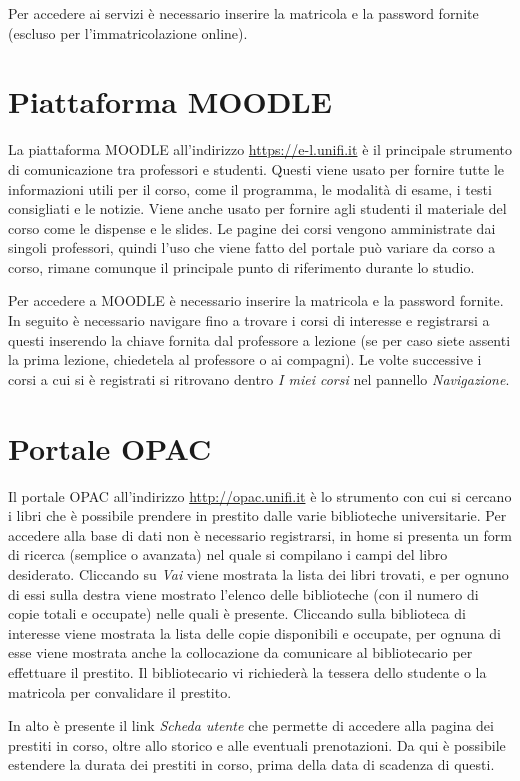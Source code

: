\documentclass[11pt,a4paper]{article}
\begin{document}
Per accedere ai servizi è necessario inserire la matricola e
la password fornite (escluso per l'immatricolazione online).

\section{Piattaforma MOODLE}
La piattaforma MOODLE all'indirizzo \url{https://e-l.unifi.it} è il
principale strumento di comunicazione tra professori e
studenti. Questi viene usato per fornire tutte le informazioni
utili per il corso, come il programma, le modalità di esame, i testi
consigliati e le notizie. Viene anche usato per fornire
agli studenti il materiale del corso come le dispense e le slides. Le
pagine dei corsi vengono amministrate dai singoli professori,
quindi l'uso che viene fatto del portale può variare da corso a corso,
rimane comunque il principale punto di riferimento durante lo studio.

Per accedere a MOODLE è necessario inserire la matricola e la password
fornite. In seguito è necessario navigare fino a trovare i corsi di
interesse e registrarsi a questi inserendo la chiave fornita dal
professore a lezione (se per caso siete assenti la prima lezione,
chiedetela al professore o ai compagni). Le volte successive i corsi a
cui si è registrati si ritrovano dentro \emph{I miei corsi} nel
pannello \emph{Navigazione}.

\section{Portale OPAC}
Il portale OPAC all'indirizzo \url{http://opac.unifi.it} è lo
strumento con cui si cercano i libri che è possibile prendere in
prestito dalle varie biblioteche universitarie. Per accedere alla base
di dati non è necessario registrarsi, in home si presenta un form di
ricerca (semplice o avanzata) nel quale si compilano i campi del libro
desiderato. Cliccando su \emph{Vai} viene mostrata 
la lista dei libri trovati, e per ognuno di essi sulla destra viene
mostrato l'elenco delle biblioteche (con il numero di copie totali e
occupate) nelle quali è presente. Cliccando sulla biblioteca di
interesse viene mostrata la lista delle copie disponibili e occupate,
per ognuna di esse viene mostrata anche la collocazione da comunicare
al bibliotecario per effettuare il prestito. Il bibliotecario vi
richiederà la tessera dello studente o la matricola per convalidare il
prestito.

In alto è presente il link \emph{Scheda utente} che permette di
accedere alla pagina dei
prestiti in corso, oltre allo storico e alle eventuali
prenotazioni. Da qui è possibile estendere la durata dei prestiti in
corso, prima della data 
di scadenza di questi.
\end{document}
